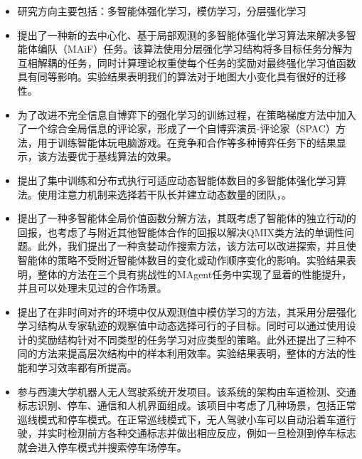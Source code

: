 
{\small
  \begin{itemize}
    \item 研究方向主要包括：多智能体强化学习，模仿学习，分层强化学习
    \item 提出了一种新的去中心化、基于局部观测的多智能体强化学习算法来解决多智能体编队（MAiF）任务。该算法使用分层强化学习结构将多目标任务分解为互相解耦的任务，同时计算理论权重使每个任务的奖励对最终强化学习值函数具有同等影响。实验结果表明我们的算法对于地图大小变化具有很好的迁移性。
    \item 为了改进不完全信息自博弈下的强化学习的训练过程，在策略梯度方法中加入了一个综合全局信息的评论家，形成了一个自博弈演员-评论家（SPAC）方法，用于训练智能体玩电脑游戏。在竞争和合作等多种博弈任务下的结果显示，该方法要优于基线算法的效果。
    \item 提出了集中训练和分布式执行可适应动态智能体数目的多智能体强化学习算法。使用注意力机制来选择若干队长并建立动态数量的团队，。
    \item 提出了一种多智能体全局价值函数分解方法，其既考虑了智能体的独立行动的回报，也考虑了与附近其他智能体合作的回报以解决QMIX类方法的单调性问题。此外，我们提出了一种贪婪动作搜索方法，该方法可以改进探索，并且使智能体的策略不受附近智能体数目的变化或动作顺序变化的影响。实验结果表明，整体的方法在三个具有挑战性的MAgent任务中实现了显着的性能提升，并且可以处理未见过的合作场景。
    \item 提出了在非时间对齐的环境中仅从观测值中模仿学习的方法，其采用分层强化学习结构从专家轨迹的观察值中动态选择可行的子目标。同时可以通过使用设计的奖励结构针对不同类型的任务学习对应类型的策略。此外还提出了三种不同的方法来提高层次结构中的样本利用效率。实验结果表明，整体的方法的性能和学习效率都有所提高。
  \end{itemize}
}

{\small
  \begin{itemize}
    \item 参与西澳大学机器人无人驾驶系统开发项目。该系统的架构由车道检测、交通标志识别、停车、通信和人机界面组成。该项目中考虑了几种场景，包括正常巡线模式和停车模式。在正常巡线模式下，无人驾驶小车可以自动沿着车道行驶，并实时检测前方各种交通标志并做出相应反应，例如一旦检测到停车标志就会进入停车模式并搜索停车场停车。
  \end{itemize}
}


